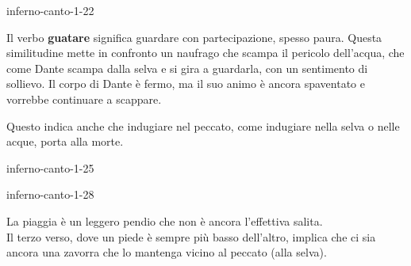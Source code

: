 \documentclass[preview]{standalone}
\begin{document}
\begin{snippet}{inferno-canto-1-22}

    Il verbo \textbf{guatare} significa guardare con partecipazione, spesso paura.
    Questa similitudine mette in confronto un naufrago che scampa il pericolo dell'acqua,
    che come Dante scampa dalla selva e si gira a guardarla, con un sentimento di sollievo.
    Il corpo di Dante è fermo, ma il suo animo è ancora spaventato e vorrebbe continuare a scappare.
    
    Questo indica anche che indugiare nel peccato, come indugiare nella selva o nelle acque, porta alla morte.
\end{snippet}

\begin{snippet}{inferno-canto-1-25}

\end{snippet}

\begin{snippet}{inferno-canto-1-28}

    La piaggia è un leggero pendio che non è ancora l'effettiva salita.
    \\
    Il terzo verso, dove un piede è sempre più basso dell'altro,
    implica che ci sia ancora una zavorra che lo mantenga vicino al peccato (alla selva).
\end{snippet}
\end{document}
